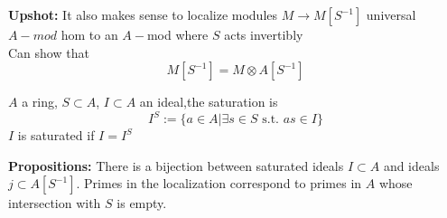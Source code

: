 \documentclass{article}
\theoremstyle{definition}
\theoremstyle{definition}
\theoremstyle{remark}
\begin{document}
\textbf{Upshot:} It also makes sense to localize modules $M \to M[S^{-1}]$ universal $A-mod$ hom to an $A-$mod where $S$ acts invertibly\\

Can show that 
\[M[S^{-1}] = M \otimes A[S^{-1}]\]

$A$ a ring, $S \subset A$, $I \subset A$ an ideal,the saturation is 
\[I^S := \{a \in A | \exists s \in S \text{ s.t. } as \in I\}\]
$I$ is saturated if $I = I^S$

\textbf{Propositions:} There is a bijection between saturated ideals $I \subset A$ and ideals $j \subset A[S^{-1}]$. 
Primes in the localization correspond to primes in $A$ whose intersection with $S$ is empty.











 




 
 
 
 
 
 
 
 
 
  





 
 
 
 
\end{document}
